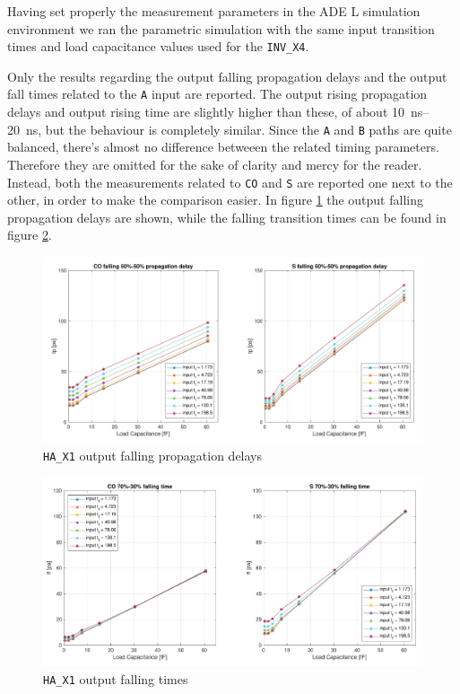 \documentclass[a4paper]{article}
\newcommand{\inv}{\texttt{INV\_X4}\xspace}
\newcommand{\ha}{\texttt{HA\_X1}\xspace}
\begin{document}
Having set properly the measurement parameters in the ADE L simulation environment we ran the parametric simulation with the same input transition times and load capacitance values used for the \inv.

Only the results regarding the output falling propagation delays and the output fall times related to the \texttt{A} input are reported. The output rising propagation delays and output rising time are slightly higher than these, of about \SIrange{10}{20}{\nano\second}, but the behaviour is completely similar. Since the \texttt{A} and \texttt{B} paths are quite balanced, there's almost no difference betweeen the related timing parameters. Therefore they are omitted for the sake of clarity and mercy for the reader. Instead, both the measurements related to \texttt{CO} and \texttt{S} are reported one next to the other, in order to make the comparison easier. In figure \ref{fig:HA_tp_L} the output falling propagation delays are shown, while the falling transition times can be found in figure \ref{fig:HA_t_F}.

\begin{figure}[ht]
	\centering
	\includegraphics[width=\linewidth]{Images/HA/tp_L_crop.pdf}
	\caption{\ha output falling propagation delays}
	\label{fig:HA_tp_L}
\end{figure}

\begin{figure}[ht]
	\centering
	\includegraphics[width=\linewidth]{Images/HA/t_F_crop.pdf}
	\caption{\ha output falling times}
	\label{fig:HA_t_F}
\end{figure}
\end{document}
